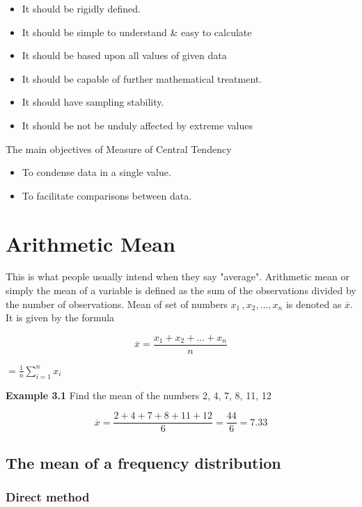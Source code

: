 \documentclass[
]{book}
\begin{document}
\begin{itemize}
\item
  It should be rigidly defined.
\item
  It should be simple to understand \& easy to calculate
\item
  It should be based upon all values of given data
\item
  It should be capable of further mathematical treatment.
\item
  It should have sampling stability.
\item
  It should be not be unduly affected by extreme values
\end{itemize}

{The main objectives of Measure of Central Tendency}

\begin{itemize}
\item
  To condense data in a single value.
\item
  To facilitate comparisons between data.
\end{itemize}

\hypertarget{arithmetic-mean}{%
\section{Arithmetic Mean}\label{arithmetic-mean}}

This is what people usually intend when they say "average". Arithmetic
mean or simply the mean of a variable is defined as the sum of the
observations divided by the number of observations. Mean of set of
numbers \(x_{1\ },x_{2},\ldots,x_{n}\) is denoted as \(\overline{x}\). It is
given by the formula

\[\overline{x} = \frac{x_{1} + x_{2} + \ldots + x_{n}}{n}\]

\(= \frac{1}{n}\sum_{i = 1}^{n}x_{i}\)

\textbf{Example 3.1} Find the mean of the numbers 2, 4, 7, 8, 11, 12

\[\overline{x} = \frac{2 + 4 + 7 + 8 + 11 + 12}{6} = \frac{44}{6} = 7.33\]

\hypertarget{the-mean-of-a-frequency-distribution}{%
\subsection{The mean of a frequency distribution}\label{the-mean-of-a-frequency-distribution}}

\hypertarget{direct-method}{%
\subsubsection{Direct method}\label{direct-method}}
\end{document}
